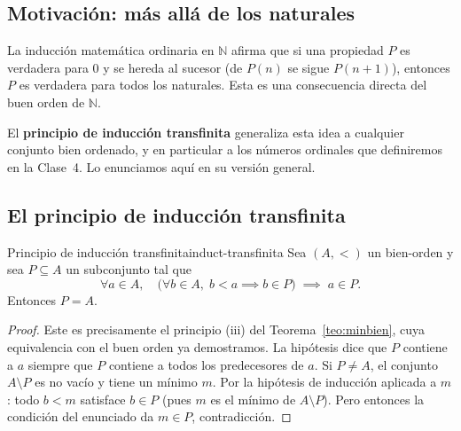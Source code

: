 \subsection{Motivación: más allá de los naturales}

La inducción matemática ordinaria en $\mathbb{N}$ afirma que si una propiedad $P$ es verdadera para $0$ y se hereda al sucesor (de $P(n)$ se sigue $P(n+1)$), entonces $P$ es verdadera para todos los naturales. Esta es una consecuencia directa del buen orden de $\mathbb{N}$.

El \textbf{principio de inducción transfinita} generaliza esta idea a cualquier conjunto bien ordenado, y en particular a los números ordinales que definiremos en la Clase~4. Lo enunciamos aquí en su versión general.

\subsection{El principio de inducción transfinita}

\begin{teorema}{Principio de inducción transfinita}{induct-transfinita}
Sea $(A, <)$ un bien-orden y sea $P \subseteq A$ un subconjunto tal que
\[
  \forall a \in A,\quad \bigl(\forall b \in A,\; b < a \implies b \in P\bigr) \;\implies\; a \in P.
\]
Entonces $P = A$.
\end{teorema}

\begin{proof}
Este es precisamente el principio (iii) del Teorema~\ref{teo:minbien}, cuya equivalencia con el buen orden ya demostramos. La hipótesis dice que $P$ contiene a $a$ siempre que $P$ contiene a todos los predecesores de $a$. Si $P \neq A$, el conjunto $A \setminus P$ es no vacío y tiene un mínimo $m$. Por la hipótesis de inducción aplicada a $m$: todo $b < m$ satisface $b \in P$ (pues $m$ es el mínimo de $A \setminus P$). Pero entonces la condición del enunciado da $m \in P$, contradicción.
\end{proof}

